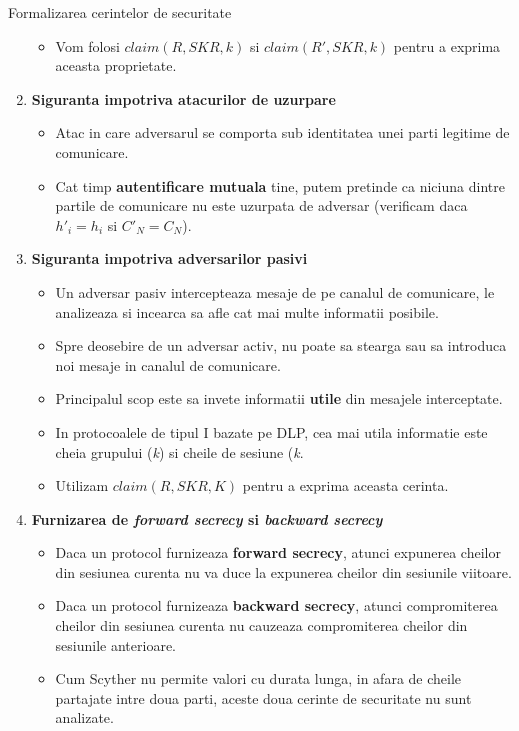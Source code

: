\documentclass[11pt]{beamer}
\begin{document}
\begin{frame}[t,allowframebreaks]{Formalizarea cerintelor de securitate}
\begin{enumerate}
\begin{itemize}
	\item Vom folosi $claim(R,SKR,k)$ si $claim(R',SKR,k)$ pentru a exprima aceasta proprietate.
	
	\end{itemize}
	
\item \textbf{Siguranta impotriva atacurilor de uzurpare}

	\begin{itemize}
	
	\item Atac in care adversarul se comporta sub identitatea unei parti legitime de comunicare.
	
	\item Cat timp \textbf{autentificare mutuala} tine, putem pretinde ca niciuna dintre partile de comunicare nu este uzurpata de adversar (verificam daca $h'_i = h_i$ si $C'_N = C_N$).
	
	\end{itemize}
	
\item \textbf{Siguranta impotriva adversarilor pasivi}

	\begin{itemize}
	
	\item Un adversar pasiv intercepteaza mesaje de pe canalul de comunicare, le analizeaza si incearca sa afle cat mai multe informatii posibile.
	\item Spre deosebire de un adversar activ, nu poate sa stearga sau sa introduca noi mesaje in canalul de comunicare.
	\item Principalul scop este sa invete informatii \textbf{utile} din mesajele interceptate.
	\item In protocoalele de tipul I bazate pe DLP, cea mai utila informatie este cheia grupului (\textit{k}) si cheile de sesiune (\textit{k}.
	\item Utilizam $claim(R,SKR,K)$ pentru a exprima aceasta cerinta.
	
	\end{itemize}
	
\item \textbf{Furnizarea de \textit{forward secrecy} si \textit{backward secrecy}}

	\begin{itemize}

	\item Daca un protocol furnizeaza \textbf{forward secrecy}, atunci expunerea cheilor din sesiunea curenta nu va duce la expunerea cheilor din sesiunile viitoare.
	\item Daca un protocol furnizeaza \textbf{backward secrecy}, atunci compromiterea cheilor din sesiunea curenta nu cauzeaza compromiterea cheilor din sesiunile anterioare.
	\item Cum Scyther nu permite valori cu durata lunga, in afara de cheile partajate intre doua parti, aceste doua cerinte de securitate nu sunt analizate.
	

\end{itemize}
\end{enumerate}
\end{frame}
\end{document}

